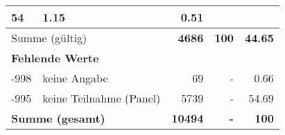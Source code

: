 \begin{longtable}{lXrrr}
       \num{54} &
       \num[round-mode=places,round-precision=2]{1.15} &
         \num[round-mode=places,round-precision=2]{0.51} \\
     \midrule
     \multicolumn{2}{l}{Summe (gültig)} &
       \textbf{\num{4686}} &
     \textbf{\num{100}} &
       \textbf{\num[round-mode=places,round-precision=2]{44.65}} \\
     \multicolumn{5}{l}{\textbf{Fehlende Werte}}\\
       -998 &
       keine Angabe &
         \num{69} &
        - &
         \num[round-mode=places,round-precision=2]{0.66} \\
       -995 &
       keine Teilnahme (Panel) &
         \num{5739} &
        - &
         \num[round-mode=places,round-precision=2]{54.69} \\
     \midrule
     \multicolumn{2}{l}{\textbf{Summe (gesamt)}} &
          \textbf{\num{10494}} &
        \textbf{-} &
        \textbf{\num{100}} \\
     \bottomrule
     \end{longtable}
     
